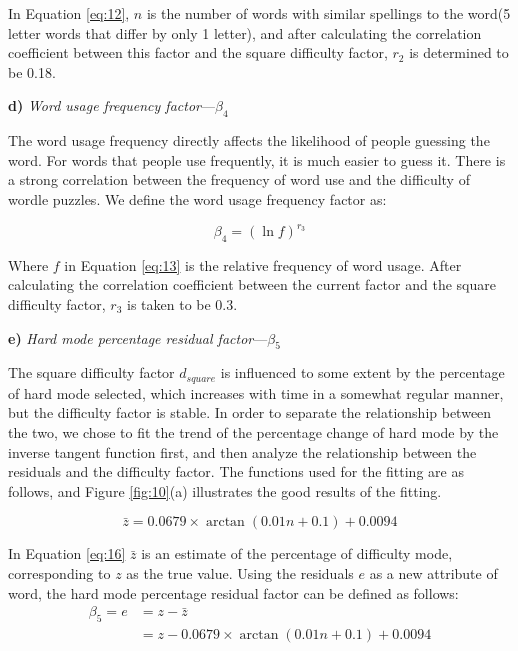 \documentclass[12pt]{mcmthesis}
\begin{document}
In Equation \ref{eq:12}, $ n $ is the number of words with similar spellings to the word(5 letter words that differ by only 1 letter), and after calculating the correlation coefficient between this factor and the square difficulty factor, $ r_{2} $ is determined to be 0.18.

\textbf{d)} \textit{Word usage frequency factor}---$ \beta_{4} $

The word usage frequency directly affects the likelihood of people guessing the word. For words that people use frequently, it is much easier to guess it. There is a strong correlation between the frequency of word use and the difficulty of wordle puzzles. We define the word usage frequency factor\cite{4} as:

\begin{equation}\label{eq:13}
\beta _4=\left( \ln f \right) ^{r_3}
\end{equation}

Where $ f $ in Equation \ref{eq:13} is the relative frequency of word usage. After calculating the correlation coefficient between the current factor and the square difficulty factor, $ r_{3} $ is taken to be 0.3.

\textbf{e)} \textit{Hard mode percentage residual factor}---$ \beta_{5} $

The square difficulty factor $ d_{square} $ is influenced to some extent by the percentage of hard mode selected, which increases with time in a somewhat regular manner, but the difficulty factor is stable. In order to separate the relationship between the two, we chose to fit the trend of the percentage change of hard mode by the inverse tangent function first, and then analyze the relationship between the residuals and the difficulty factor\cite{5}. The functions used for the fitting are as follows, and Figure \ref{fig:10}(a) illustrates the good results of the fitting.

\begin{equation}\label{eq:16}
\bar{z}=0.0679\times \arctan \left( 0.01n+0.1 \right) +0.0094
\end{equation}

In Equation \ref{eq:16} $ \bar{z} $ is an estimate of the percentage of difficulty mode, corresponding to $ z $ as the true value. Using the residuals $ e $ as a new attribute of word, the hard mode percentage residual factor can be defined as follows:
\begin{equation}\label{eq:17}
	\begin{aligned}
		\beta _5=e&=z-\bar{z}\\
		&=z-0.0679\times \arctan \left( 0.01n+0.1 \right) +0.0094
	\end{aligned}
\end{equation}
\\[0.01pt]
\end{document}
